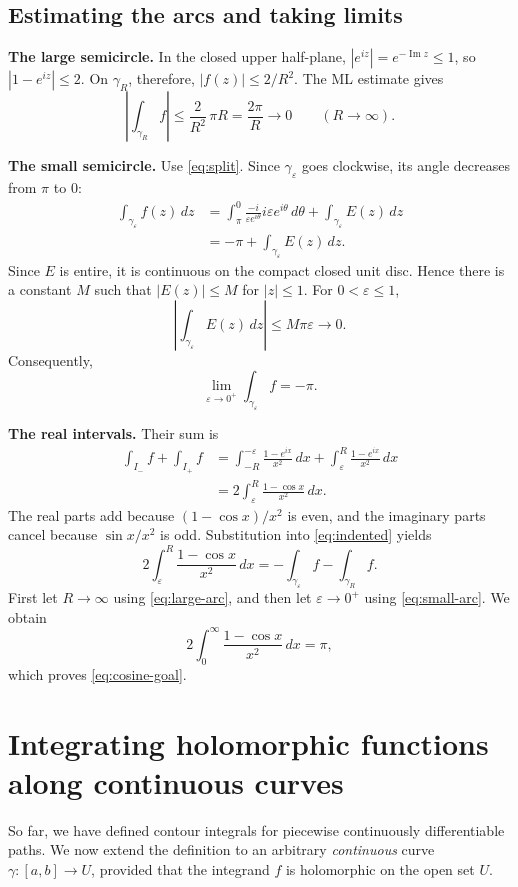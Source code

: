 \documentclass[11pt]{article}
\theoremstyle{plain}
\theoremstyle{definition}
\theoremstyle{remark}
\numberwithin{equation}{section}
\DeclareMathOperator{\Imag}{Im}
\begin{document}
\subsection{Estimating the arcs and taking limits}
\textbf{The large semicircle.} In the closed upper half-plane,
$|e^{iz}|=e^{-\Imag z}\leq1$, so $|1-e^{iz}|\leq2$.
On $\gamma_R$, therefore, $|f(z)|\leq2/R^2$. The ML estimate gives
\begin{equation}\label{eq:large-arc}
 \left|\int_{\gamma_R}f\right|
 \leq\frac{2}{R^2}\,\pi R=\frac{2\pi}{R}\longrightarrow0
 \qquad(R\to\infty).
\end{equation}

\textbf{The small semicircle.} Use \eqref{eq:split}. Since
$\gamma_\varepsilon$ goes clockwise, its angle decreases from $\pi$ to $0$:
\begin{align*}
 \int_{\gamma_\varepsilon}f(z)\,dz
 &=\int_\pi^0\frac{-i}{\varepsilon e^{i\theta}}
       i\varepsilon e^{i\theta}\,d\theta
       +\int_{\gamma_\varepsilon}E(z)\,dz\\
 &=-\pi+\int_{\gamma_\varepsilon}E(z)\,dz.
\end{align*}
Since $E$ is entire, it is continuous on the compact closed unit disc.
Hence there is a constant $M$ such that
$|E(z)|\leq M$ for $|z|\leq1$. For $0<\varepsilon\leq1$,
\[
 \left|\int_{\gamma_\varepsilon}E(z)\,dz\right|
 \leq M\pi\varepsilon\longrightarrow0.
\]
Consequently,
\begin{equation}\label{eq:small-arc}
 \lim_{\varepsilon\to0^+}\int_{\gamma_\varepsilon}f=-\pi.
\end{equation}

\textbf{The real intervals.} Their sum is
\begin{align*}
 \int_{I_-}f+\int_{I_+}f
 &=\int_{-R}^{-\varepsilon}\frac{1-e^{ix}}{x^2}\,dx
   +\int_\varepsilon^R\frac{1-e^{ix}}{x^2}\,dx\\
 &=2\int_\varepsilon^R\frac{1-\cos x}{x^2}\,dx.
\end{align*}
The real parts add because $(1-\cos x)/x^2$ is even, and the imaginary
parts cancel because $\sin x/x^2$ is odd. Substitution
into \eqref{eq:indented} yields
\[
 2\int_\varepsilon^R\frac{1-\cos x}{x^2}\,dx
 =-\int_{\gamma_\varepsilon}f-\int_{\gamma_R}f.
\]
First let $R\to\infty$ using \eqref{eq:large-arc}, and then let
$\varepsilon\to0^+$ using \eqref{eq:small-arc}. We obtain
\[
 2\int_0^\infty\frac{1-\cos x}{x^2}\,dx=\pi,
\]
which proves \eqref{eq:cosine-goal}.

\section{Integrating holomorphic functions along continuous curves}
So far, we have defined contour integrals for piecewise continuously
differentiable paths. We now extend the definition to an arbitrary
\emph{continuous} curve $\gamma\colon[a,b]\to U$, provided that the
integrand $f$ is holomorphic on the open set $U$.
\end{document}
